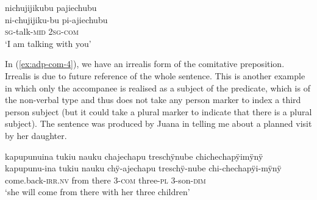 \ea\label{ex:adp-com-3}
\begingl
\glpreamble nichujijikubu pajiechubu\\
\gla ni-chujijiku-bu pi-ajiechubu\\
\textsc{sg}-talk-\textsc{mid} 2\textsc{sg}-\textsc{com}\\
\glft ‘I am talking with you’
\endgl
\trailingcitation{[rxx-e141230s.133]} %
\xe

In (\ref{ex:adp-com-4}), we have an irrealis form of the comitative preposition. Irrealis is due to future reference of the whole sentence. This is another example in which only the accompanee is realised as a subject of the predicate, which is of the non-verbal type and thus does not take any person marker to index a third person subject (but it could take a plural marker to indicate that there is a plural subject). The sentence was produced by Juana in telling me about a planned visit by her daughter.
\newpage

\ea\label{ex:adp-com-4}
\begingl
\glpreamble kapupunuina tukiu nauku chajechapu treschÿnube chichechapÿimÿnÿ\\
\gla kapupunu-ina tukiu nauku chÿ-ajechapu treschÿ-nube chi-chechapÿi-mÿnÿ\\
\glb come.back-\textsc{irr.nv} from there 3-\textsc{com} three-\textsc{pl} 3-son-\textsc{dim}\\
\glft ‘she will come from there with her three children’
\endgl
\trailingcitation{[jxx-p110923l-1.253-254]}
\xe

